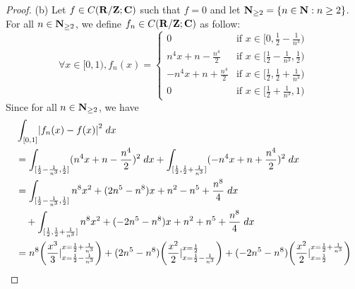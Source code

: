 \begin{proof}{(b)}
  Let \(f \in C(\mathbf{R} / \mathbf{Z} ; \mathbf{C})\) such that \(f = 0\) and let \(\mathbf{N}_{\geq 2} = \{n \in \mathbf{N} : n \geq 2\}\).
  For all \(n \in \mathbf{N}_{\geq 2}\), we define \(f_n \in C(\mathbf{R} / \mathbf{Z} ; \mathbf{C})\) as follow:
  \[
    \forall x \in [0, 1), f_n(x) = \begin{cases}
      0                          & \text{if } x \in [0, \frac{1}{2} - \frac{1}{n^3})           \\
      n^4 x + n - \frac{n^4}{2}  & \text{if } x \in [\frac{1}{2} - \frac{1}{n^3}, \frac{1}{2}) \\
      -n^4 x + n + \frac{n^4}{2} & \text{if } x \in [\frac{1}{2}, \frac{1}{2} + \frac{1}{n^3}) \\
      0                          & \text{if } x \in [\frac{1}{2} + \frac{1}{n^3}, 1)
    \end{cases}
  \]
  Since for all \(n \in \mathbf{N}_{\geq 2}\), we have
  \begin{align*}
     & \int_{[0, 1]} \abs{f_n(x) - f(x)}^2 \; dx                                                                                                                                                                                                                                                         \\
     & = \int_{[\frac{1}{2} - \frac{1}{n^3}, \frac{1}{2}]} (n^4 x + n - \frac{n^4}{2})^2 \; dx + \int_{[\frac{1}{2}, \frac{1}{2} + \frac{1}{n^3}]} (-n^4 x + n + \frac{n^4}{2})^2 \; dx                                                                                                                  \\
     & = \int_{[\frac{1}{2} - \frac{1}{n^3}, \frac{1}{2}]} n^8 x^2 + (2n^5 - n^8) x + n^2 - n^5 + \frac{n^8}{4} \; dx                                                                                                                                                                                    \\
     & \quad + \int_{[\frac{1}{2}, \frac{1}{2} + \frac{1}{n^3}]} n^8 x^2 + (-2n^5 - n^8) x + n^2 + n^5 + \frac{n^8}{4} \; dx                                                                                                                                                                             \\
     & = n^8 \bigg(\frac{x^3}{3}|_{x = \frac{1}{2} - \frac{1}{n^3}}^{x = \frac{1}{2} + \frac{1}{n^3}}\bigg) + (2n^5 - n^8) \bigg(\frac{x^2}{2}|_{x = \frac{1}{2} - \frac{1}{n^3}}^{x = \frac{1}{2}}\bigg) + (-2n^5 - n^8) \bigg(\frac{x^2}{2}|_{x = \frac{1}{2}}^{x = \frac{1}{2} + \frac{1}{n^3}}\bigg) \\

\end{align*}
\end{proof}
